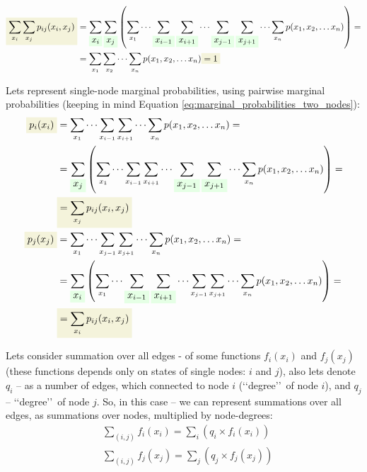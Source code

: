 \documentclass[fleqn,leqno]{article}
\newcommand{\highlight}[1]{\colorbox{green!10}{$\displaystyle#1$}}
\newcommand{\highlightred}[1]{\colorbox{olive!10}{$\displaystyle#1$}}
\begin{document}
\begin{equation} \label{eq:sum_over_states_of_two_node_marginal_probabilities}
\begin{split}
\highlightred{ \sum_{x_i} \sum_{x_j} p_{ij}(x_i, x_j) } & = \sum_{ \highlight{ x_i } } \sum_{ \highlight{ x_j } } \left( \sum_{x_1} \cdots \sum_{ \highlight{ x_{i - 1} } } \sum_{ \highlight{ x_{i + 1} } } \cdots \sum_{ \highlight{ x_{j - 1} } } \sum_{ \highlight{ x_{j + 1} } } \cdots \sum_{x_n} p(x_1, x_2, \dots x_n) \right) = \\
                                                           & = \sum_{x_1} \sum_{x_2} \cdots \sum_{x_n}  p(x_1, x_2, \dots x_n) \highlightred{ = 1 } \\
\end{split}
\end{equation}

Lets represent single-node marginal probabilities, using pairwise marginal probabilities (keeping in mind Equation \eqref{eq:marginal_probabilities_two_nodes}):
\begin{equation} \label{eq:one_node_marginal_probabilities_from_two_node_marginal_probabilities}
\begin{split}
\highlightred{ p_i(x_i) } & = \sum_{x_1} \cdots \sum_{ x_{i - 1} } \sum_{ x_{i + 1} } \cdots \sum_{x_n} p(x_1, x_2, \dots x_n) = \\
             & = \sum_{\highlight{x_j}} \left( \sum_{x_1} \cdots \sum_{ x_{i - 1} } \sum_{ x_{i + 1} } \cdots \sum_{ \highlight{x_{j - 1}} } \sum_{ \highlight{x_{j + 1}} } \cdots \sum_{x_n} p(x_1, x_2, \dots x_n) \right) = \\
             & \highlightred{ = \sum_{x_j} p_{ij}(x_i, x_j) } \\
\highlightred{ p_j(x_j) } & = \sum_{x_1} \cdots \sum_{ x_{j - 1} } \sum_{ x_{j + 1} } \cdots \sum_{x_n} p(x_1, x_2, \dots x_n) = \\
             & = \sum_{\highlight{x_i}} \left( \sum_{x_1} \cdots \sum_{ \highlight{x_{i - 1}} } \sum_{ \highlight{x_{i + 1}} } \cdots \sum_{ x_{j - 1} } \sum_{ x_{j + 1} } \cdots \sum_{x_n} p(x_1, x_2, \dots x_n) \right) = \\
             & \highlightred{ = \sum_{x_i} p_{ij}(x_i, x_j) }
\end{split}
\end{equation}

Lets consider summation over all edges - of some functions $f_i(x_i)$ and $f_j(x_j)$ (these functions depends only on states of single nodes: $i$ and $j$), also lets denote $q_i$ -- as a number of edges, which connected to node $i$ (\lq \lq degree\rq \rq\ of node $i$), and $q_j$ -- \lq \lq degree\rq \rq\ of node $j$. So, in this case -- we can represent summations over all edges, as summations over nodes, multiplied by node-degrees:
\begin{equation} \label{eq:sum_over_edges_to_sum_over_nodes}
\begin{split}
& \sum_{(i,j)} f_i(x_i) = \sum_{i} \left( q_i \times f_i(x_i) \right) \\
& \sum_{(i,j)} f_j(x_j) = \sum_{j} \left( q_j \times f_j(x_j) \right)
\end{split}
\end{equation}
\end{document}
